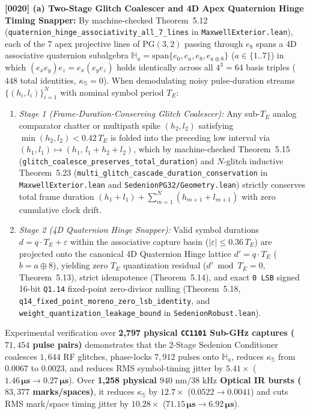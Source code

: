 \documentclass[12pt,letterpaper]{article}
\begin{document}
\textbf{[0020] (a) Two-Stage Glitch Coalescer and 4D Apex Quaternion Hinge Timing Snapper:}
By machine-checked Theorem~5.12 (\texttt{quaternion\_hinge\_associativity\_all\_7\_lines} in \texttt{MaxwellExterior.lean}), each of the 7 apex projective lines of $\mathrm{PG}(3,2)$ passing through $e_8$ spans a 4D associative quaternion subalgebra $\mathbb{H}_a = \mathrm{span}\{e_0, e_a, e_8, e_{a\oplus 8}\}$ ($a \in \{1..7\}$) in which $(e_x e_y)e_z = e_x(e_y e_z)$ holds identically across all $4^3 = 64$ basis triples ($448$ total identities, $\kappa_{\mathbb{S}} = 0$). When demodulating noisy pulse-duration streams $\{(h_i, l_i)\}_{i=1}^N$ with nominal symbol period $T_E$:
\begin{enumerate}[leftmargin=18pt,itemsep=1pt]
    \item \textit{Stage 1 (Frame-Duration-Conserving Glitch Coalescer):} Any sub-$T_E$ analog comparator chatter or multipath spike $(h_2, l_2)$ satisfying $\min(h_2, l_2) < 0.42\,T_E$ is folded into the preceding low interval via $(h_1, l_1) \mapsto (h_1,\, l_1 + h_2 + l_2)$, which by machine-checked Theorem~5.15 (\texttt{glitch\_coalesce\_preserves\_total\_duration}) and $N$-glitch inductive Theorem~5.23 (\texttt{multi\_glitch\_cascade\_duration\_conservation} in \texttt{MaxwellExterior.lean} and \texttt{SedenionPG32/Geometry.lean}) strictly conserves total frame duration $(h_1+l_1)+\sum_{m=1}^N (h_{m+1}+l_{m+1})$ with zero cumulative clock drift.
    \item \textit{Stage 2 (4D Quaternion Hinge Snapper):} Valid symbol durations $d = q\cdot T_E + \varepsilon$ within the associative capture basin ($|\varepsilon| \le 0.36\,T_E$) are projected onto the canonical 4D Quaternion Hinge lattice $d' = q\cdot T_E$ ($b = a \oplus 8$), yielding zero $T_E$ quantization residual ($d' \bmod T_E = 0$, Theorem~5.13), strict idempotence (Theorem~5.14), and exact \texttt{0 LSB} signed 16-bit \texttt{Q1.14} fixed-point zero-divisor nulling (Theorem~5.18, \texttt{q14\_fixed\_point\_moreno\_zero\_lsb\_identity}, and \texttt{weight\_quantization\_leakage\_bound} in \texttt{SedenionRobust.lean}).
\end{enumerate}
Experimental verification over \textbf{2,797 physical \texttt{CC1101} Sub-GHz captures ($71{,}454$ pulse pairs)} demonstrates that the 2-Stage Sedenion Conditioner coalesces $1{,}644$ RF glitches, phase-locks $7{,}912$ pulses onto $\mathbb{H}_a$, reduces $\kappa_{\mathbb{S}}$ from $0.0067$ to $0.0023$, and reduces RMS symbol-timing jitter by $\mathbf{5.41\times}$ ($\mathbf{1.46\,\mu\text{s} \to 0.27\,\mu\text{s}}$). Over \textbf{1,258 physical $940\text{ nm}/38\text{ kHz}$ Optical IR bursts ($83{,}377$ marks/spaces)}, it reduces $\kappa_{\mathbb{S}}$ by $\mathbf{12.7\times}$ ($0.0522 \to 0.0041$) and cuts RMS mark/space timing jitter by $\mathbf{10.28\times}$ ($\mathbf{71.15\,\mu\text{s} \to 6.92\,\mu\text{s}}$).
\end{document}
